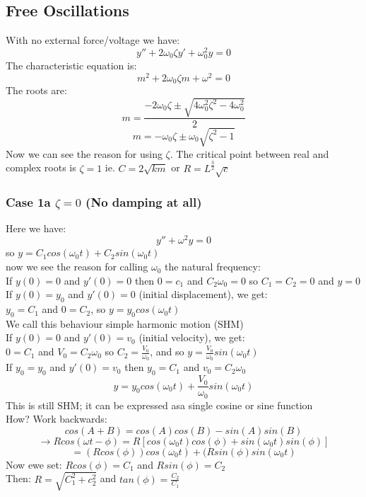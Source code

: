 \documentclass[12pt]{article}
\begin{document}
	\subsection*{Free Oscillations}
	With no external force/voltage we have:\\
	$$y'' + 2\omega_0\zeta y' + \omega_0^2 y = 0$$
	The characteristic equation is:\\
	$$m^2 + 2\omega_0\zeta m + \omega^2 = 0$$
	The roots are:\\
	$$m = \frac{-2\omega_0 \zeta \pm \sqrt{4\omega_0^2\zeta^2 - 4\omega_0^2}}{2}$$
	$$m = -\omega_0\zeta \pm \omega_0\sqrt{\zeta^2 - 1}$$
	Now we can see the reason for using $\zeta$. The critical point between real and complex roots is $\zeta = 1$ ie. $C = 2\sqrt{km}$ or $R = L^{\frac{3}{2}}\sqrt{c}$
	
	\subsubsection*{Case 1a $\zeta = 0$ (No damping at all)}
	
	Here we have:\\
	$$y'' + \omega^2 y = 0$$
	so $y = C_1cos(\omega_0 t) + C_2sin(\omega_0 t)$\\
	now we see the reason for calling $\omega_0$ the natural frequency:\\
	If $y(0) = 0$ and $y'(0) = 0$ then $0 = c_1$ and $C_2\omega_0 = 0$ so $C_1 = C_2 = 0$ and $y = 0$\\
	
	If $y(0) = y_0$ and $y'(0) = 0$ (initial displacement), we get:\\
	$y_0 = C_1$ and $0 = C_2$, so $y = y_0cos(\omega_0 t)$\\
	We call this behaviour simple harmonic motion (SHM)\\
	If $y(0) = 0$ and $y'(0) = v_0$ (initial velocity), we get:\\
	$0 = C_1$ and $V_0 = C_2\omega_0$ so $C_2 = \frac{V_0}{\omega_0}$, and so $y = \frac{V_0}{\omega_0}sin(\omega_0 t)$\\
	
	If $y_0 = y_0$ and $y'(0) = v_0$ then $y_0 = C_1$ and $v_0 = C_2\omega_0$\\
	$$y = y_0cos(\omega_0 t) + \frac{V_0}{\omega_0}sin(\omega_0 t)$$
	This is still SHM; it can be expressed asa single cosine or sine function\\
	
	How? Work backwards:\\
	$$cos(A + B) = cos(A)cos(B) - sin(A)sin(B)$$
	$$\rightarrow Rcos(\omega t - \phi) = R[cos(\omega_0 t)cos(\phi) + sin(\omega_0 t)sin(\phi)]$$
	$$= (Rcos(\phi))cos(\omega_0 t) + (Rsin(\phi)sin(\omega_0 t)$$
	Now ewe set: $Rcos(\phi) = C_1$ and $Rsin(\phi) = C_2$\\
	Then: $R = \sqrt{C_1^2 + c_2^2}$ and $tan(\phi) = \frac{C_2}{C_1}$\\
	
\end{document}
